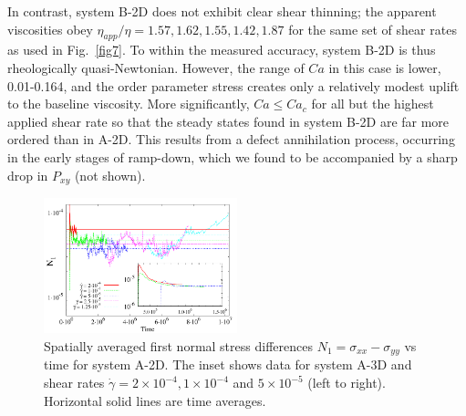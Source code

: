 \documentclass[8.5pt,twoside,twocolumn]{article}
\begin{document}
In contrast, system B-2D does not exhibit clear shear thinning; the apparent viscosities obey $\eta_{app}/\eta=1.57, 1.62, 1.55, 1.42, 1.87$ for the same set of shear rates as used in Fig.~\ref{fig7}. To within the measured accuracy, system B-2D is thus rheologically quasi-Newtonian. However, the range of $Ca$ in this case is lower, 0.01-0.164, and the order parameter stress creates only a relatively modest uplift to the baseline viscosity. More significantly, $Ca\le Ca_c$ for all but the highest applied shear rate so that the steady states found in system B-2D are far more ordered than in A-2D. This results from a defect annihilation process, occurring in the early stages of ramp-down, which we found to be accompanied by a sharp drop in $P_{xy}$ (not shown).

\begin{figure}[htp!]
\centering
\includegraphics[angle=0,width=0.5\textwidth]{N1_t_5e-4.pdf}
\caption{Spatially averaged first normal stress differences $N_1= \sigma_{xx}-\sigma_{yy}$ vs time for system A-2D. The inset shows data for system A-3D and shear rates $\dot{\gamma}=2\times10^{-4}, 1\times10^{-4}$ and $5\times10^{-5}$ (left to right). Horizontal solid lines are time averages.}
\label{fig8}
\end{figure}
\end{document}
